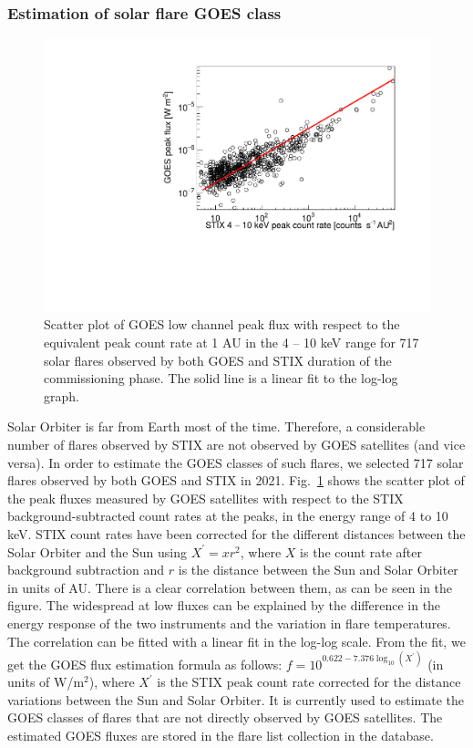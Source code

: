\documentclass[referee]{preaa} %
\begin{document}
\subsubsection{Estimation of solar flare GOES class }
\begin{figure}
  \centering
  \includegraphics[width=0.8\linewidth]{figures/goes_stix_flux_paper.pdf}
  \caption{Scatter plot of GOES low channel peak flux with respect to the equivalent  peak count rate  at 1 AU  in the 4 -- 10 keV range for 717 solar flares observed by both GOES and STIX duration of the commissioning phase.   The solid line is a linear fit to the log-log graph. }
\label{fig:goes-stix}
\end{figure}
Solar Orbiter is far from Earth most of the time. 
Therefore, a considerable number of flares observed by STIX 
are not observed by GOES satellites (and vice versa). 
In order to estimate the GOES classes of such flares, 
we selected 717 solar flares observed by both GOES and STIX in 2021. 
Fig.~\ref{fig:goes-stix} shows the scatter plot of the peak fluxes
measured by GOES satellites with respect to the STIX background-subtracted count rates at the peaks, 
 in the energy range of 4 to 10 keV. 
STIX count rates have been corrected for 
the different distances between the Solar Orbiter and the Sun using $X^{'}=x r^2$,
where $X$ is the count rate after background subtraction
 and $r$ is the distance between the Sun and Solar Orbiter in units of AU.  There is a clear correlation between them, as can be seen in the figure.  The widespread at low fluxes can be explained by the difference in 
the energy response of the two instruments and the variation in flare temperatures. 
The correlation can be fitted with a linear fit in the log-log scale. 
From the fit, we get the GOES flux estimation formula as follows: 
$f = 10^{0.622 -7.376 \log_{10} (X^{'})}$ (in units of W/m$^2$), where $X^{'}$ is the STIX peak count rate corrected for the distance variations between the Sun and Solar Orbiter. It is currently used to estimate the GOES classes of flares that are not directly observed by GOES satellites.  The estimated GOES fluxes are stored in the flare list collection in the database. 
\end{document}
